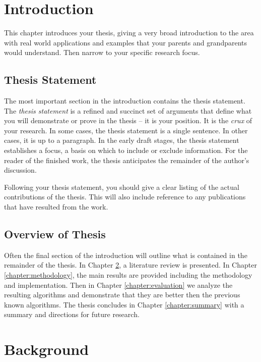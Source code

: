 \chapter{Introduction}
\label{chapter:intro}

This chapter introduces your thesis, giving a very broad introduction to the area with real world applications
and examples that your parents and grandparents would understand.  Then narrow to your specific research focus.

\section{Thesis Statement}  

The most important section in the introduction contains the thesis statement.  The \emph{thesis statement} is a refined and succinct set of arguments that define what you will demonstrate or prove in the thesis -- it is your position. It is the \emph{crux} of your research.  In some cases, the thesis statement is a single sentence.  In other cases, it is up to a paragraph.  In the early draft stages, the thesis statement establishes a focus, a basis on which to include or exclude information. For the reader of the finished work, the thesis anticipates the remainder of the author's discussion. 

Following your thesis statement, you should give a clear listing of the actual contributions of the thesis.   This will also include reference to  any publications that have resulted from the work.

\section{Overview of Thesis}  

Often the final section of the introduction will outline what is contained in the remainder of the thesis.  In Chapter \ref{chapter:background}, a literature review is presented.  In Chapter \ref{chapter:methodology}, the main results are provided including the methodology and implementation.  Then in Chapter \ref{chapter:evaluation} we analyze the resulting algorithms and demonstrate that they are better then the previous known algorithms.  The thesis concludes in Chapter \ref{chapter:summary} with a summary and directions for future research.


\chapter{Background}
\label{chapter:background}

